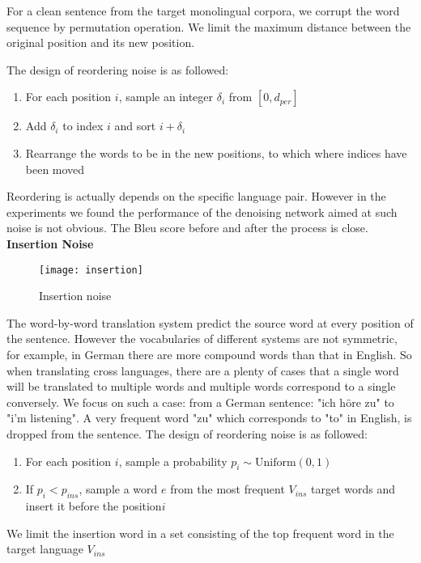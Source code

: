 	For a clean sentence from the target monolingual corpora, we corrupt the word sequence by permutation operation. We limit the maximum distance between the original position and its new position.
	
	The design of reordering noise is as followed:
	\begin{enumerate}
		\item For each position ${i}$, sample an integer ${\delta_i}$ from ${[0, d_{per}]}$
		\item Add ${\delta_{i}}$ to index ${i}$ and sort ${i+\delta_{i}}$
		\item Rearrange the words to be in the new positions, to which where indices have been moved
	\end{enumerate}

	Reordering is actually depends on the specific language pair. However in the experiments we found the performance of the denoising network aimed at such noise is not obvious. The Bleu score before and after the process is close.\\

	
	\textbf{Insertion Noise}\\
	\begin{figure}[ht]
	\texttt{[image: insertion]}
	\caption{Insertion noise}
	\centering
\end{figure}	

	The word-by-word translation system predict the source word at every position of the sentence. However the vocabularies of different systems are not symmetric, for example, in German there are more compound words than that in English. So when translating cross languages, there are a plenty of cases that a single word will be translated to multiple words and multiple words correspond to a single conversely. We focus on such a case: from a German sentence: "ich höre zu" to "i'm listening". A very frequent word "zu" which corresponds to "to" in English, is dropped from the sentence. The design of reordering noise is as followed:
	\begin{enumerate}	
		\item For each position ${i}$, sample a probability ${p_i \sim \textrm{Uniform}(0,1)}$
		\item If ${p_i} < p_{ins}$, sample a word ${e}$ from the most frequent ${V_{ins}}$ target words and insert it before the position${i}$
	\end{enumerate}

	We limit the insertion word in a set consisting of the top frequent word in the target language ${V_{ins}}$ \\
	
